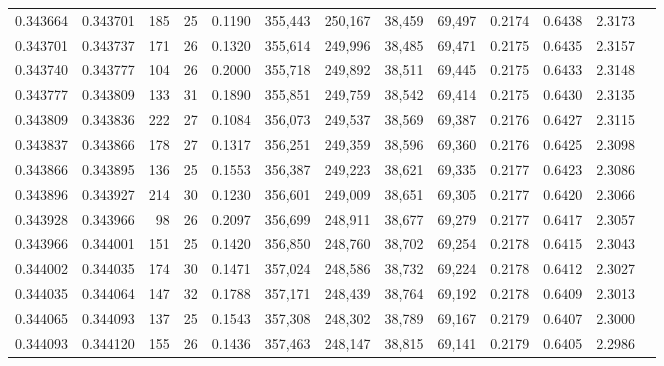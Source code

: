 \begin{tabular}{rrrrrrrrrrrrr}
0.343664 & 0.343701 &   185 &  25 &                                     0.1190 & 355,443 & 250,167 &  38,459 &  69,497 & 0.2174 & 0.6438 & 2.3173 \\
0.343701 & 0.343737 &   171 &  26 &                                     0.1320 & 355,614 & 249,996 &  38,485 &  69,471 & 0.2175 & 0.6435 & 2.3157 \\
0.343740 & 0.343777 &   104 &  26 &                                     0.2000 & 355,718 & 249,892 &  38,511 &  69,445 & 0.2175 & 0.6433 & 2.3148 \\
0.343777 & 0.343809 &   133 &  31 &                                     0.1890 & 355,851 & 249,759 &  38,542 &  69,414 & 0.2175 & 0.6430 & 2.3135 \\
0.343809 & 0.343836 &   222 &  27 &                                     0.1084 & 356,073 & 249,537 &  38,569 &  69,387 & 0.2176 & 0.6427 & 2.3115 \\
0.343837 & 0.343866 &   178 &  27 &                                     0.1317 & 356,251 & 249,359 &  38,596 &  69,360 & 0.2176 & 0.6425 & 2.3098 \\
0.343866 & 0.343895 &   136 &  25 &                                     0.1553 & 356,387 & 249,223 &  38,621 &  69,335 & 0.2177 & 0.6423 & 2.3086 \\
0.343896 & 0.343927 &   214 &  30 &                                     0.1230 & 356,601 & 249,009 &  38,651 &  69,305 & 0.2177 & 0.6420 & 2.3066 \\
0.343928 & 0.343966 &    98 &  26 &                                     0.2097 & 356,699 & 248,911 &  38,677 &  69,279 & 0.2177 & 0.6417 & 2.3057 \\
0.343966 & 0.344001 &   151 &  25 &                                     0.1420 & 356,850 & 248,760 &  38,702 &  69,254 & 0.2178 & 0.6415 & 2.3043 \\
0.344002 & 0.344035 &   174 &  30 &                                     0.1471 & 357,024 & 248,586 &  38,732 &  69,224 & 0.2178 & 0.6412 & 2.3027 \\
0.344035 & 0.344064 &   147 &  32 &                                     0.1788 & 357,171 & 248,439 &  38,764 &  69,192 & 0.2178 & 0.6409 & 2.3013 \\
0.344065 & 0.344093 &   137 &  25 &                                     0.1543 & 357,308 & 248,302 &  38,789 &  69,167 & 0.2179 & 0.6407 & 2.3000 \\
0.344093 & 0.344120 &   155 &  26 &                                     0.1436 & 357,463 & 248,147 &  38,815 &  69,141 & 0.2179 & 0.6405 & 2.2986 \\

\end{tabular}
